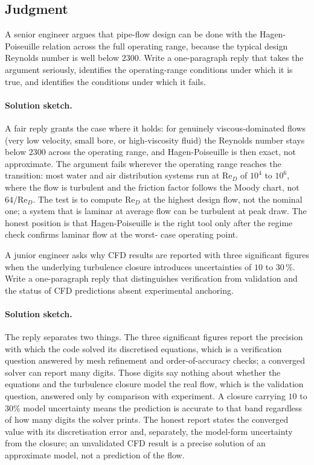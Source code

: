 \subsection*{Judgment}

\begin{exercise}
A senior engineer argues that pipe-flow design can be done with
the Hagen-Poiseuille relation across the full operating range,
because the typical design Reynolds number is well below $2300$.
Write a one-paragraph reply that takes the argument seriously,
identifies the operating-range conditions under which it is true,
and identifies the conditions under which it fails.

\paragraph{Solution sketch.} A fair reply grants the case where it
holds: for genuinely viscous-dominated flows (very low velocity, small
bore, or high-viscosity fluid) the Reynolds number stays below $2300$
across the operating range, and Hagen-Poiseuille is then exact, not
approximate. The argument fails wherever the operating range reaches
the transition: most water and air distribution systems run at
$\text{Re}_D$ of $10^4$ to $10^6$, where the flow is turbulent and the
friction factor follows the Moody chart, not $64/\text{Re}_D$. The
test is to compute $\text{Re}_D$ at the highest design flow, not the
nominal one; a system that is laminar at average flow can be turbulent
at peak draw. The honest position is that Hagen-Poiseuille is the right
tool only after the regime check confirms laminar flow at the worst-
case operating point.
\end{exercise}

\begin{exercise}
A junior engineer asks why CFD results are reported with three
significant figures when the underlying turbulence closure
introduces uncertainties of $10$ to $30\,\%$. Write a one-paragraph
reply that distinguishes verification from validation and the
status of CFD predictions absent experimental anchoring.

\paragraph{Solution sketch.} The reply separates two things. The three
significant figures report the precision with which the code solved its
discretised equations, which is a verification question answered by
mesh refinement and order-of-accuracy checks; a converged solver can
report many digits. Those digits say nothing about whether the
equations and the turbulence closure model the real flow, which is the
validation question, answered only by comparison with experiment. A
closure carrying $10$ to $30\%$ model uncertainty means the prediction
is accurate to that band regardless of how many digits the solver
prints. The honest report states the converged value with its
discretisation error and, separately, the model-form uncertainty from
the closure; an unvalidated CFD result is a precise solution of an
approximate model, not a prediction of the flow.
\end{exercise}

